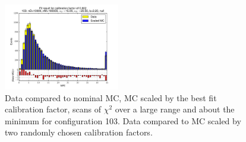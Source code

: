 \begin{figure}[htbp]
\begin{center}
\includegraphics[width=0.45\textwidth]{../FIGURES/103/FIG_Fit_result_for_calibration_factor_of_0_802.pdf} 
\caption{Data compared to nominal MC, MC scaled by the best fit calibration factor, scans of $\chi^2$ over a large range and about the minimum for configuration 103. Data compared to MC scaled by two randomly chosen calibration factors.} 
\label{tab:best_103} 
\end{center} \end{figure} 

